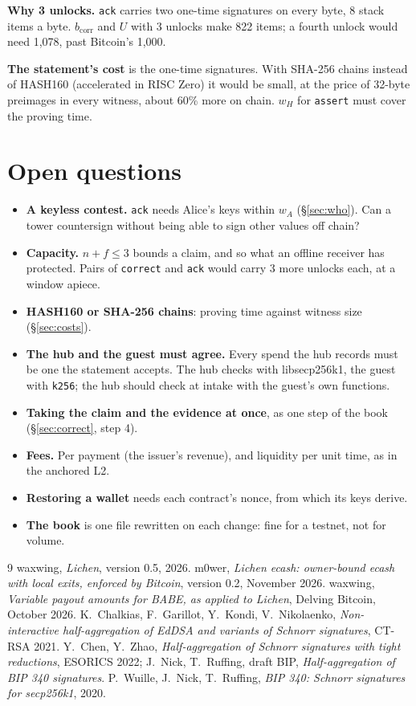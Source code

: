 \documentclass[11pt]{article}
\theoremstyle{plain}
\theoremstyle{definition}
\newcommand{\bcorr}{b_{\mathrm{corr}}}
\newcommand{\tx}[1]{\texttt{#1}}
\begin{document}
\textbf{Why 3 unlocks.} \tx{ack} carries two one-time signatures on
every byte, 8 stack items a byte. $\bcorr$ and $U$ with 3 unlocks make
822 items; a fourth unlock would need 1,078, past Bitcoin's 1,000.

\textbf{The statement's cost} is the one-time signatures. With SHA-256
chains instead of HASH160 (accelerated in RISC Zero) it would be small,
at the price of 32-byte preimages in every witness, about 60\% more
on chain. $w_H$ for \tx{assert} must cover the proving time.

\section{Open questions}\label{sec:open}

\begin{itemize}[nosep]
\item \textbf{A keyless contest.} \tx{ack} needs Alice's keys within
  $w_A$ (\S\ref{sec:who}). Can a tower countersign without being able
  to sign other values off chain?
\item \textbf{Capacity.} $n + f \le 3$ bounds a claim, and so what an
  offline receiver has protected. Pairs of \tx{correct} and \tx{ack}
  would carry 3 more unlocks each, at a window apiece.
\item \textbf{HASH160 or SHA-256 chains}: proving time against witness
  size (\S\ref{sec:costs}).
\item \textbf{The hub and the guest must agree.} Every spend the hub
  records must be one the statement accepts. The hub checks with
  libsecp256k1, the guest with \tx{k256}; the hub should check at intake
  with the guest's own functions.
\item \textbf{Taking the claim and the evidence at once}, as one step
  of the book (\S\ref{sec:correct}, step 4).
\item \textbf{Fees.} Per payment (the issuer's revenue), and liquidity
  per unit time, as in the anchored L2.
\item \textbf{Restoring a wallet} needs each contract's nonce, from
  which its keys derive.
\item \textbf{The book} is one file rewritten on each change: fine for a
  testnet, not for volume.
\end{itemize}

\begin{thebibliography}{9}
 waxwing, \emph{Lichen}, version 0.5, 2026.
 m0wer, \emph{Lichen ecash: owner-bound ecash with local
  exits, enforced by Bitcoin}, version 0.2, November 2026.
 waxwing, \emph{Variable payout amounts for BABE, as
  applied to Lichen}, Delving Bitcoin, October 2026.
 K.~Chalkias, F.~Garillot, Y.~Kondi, V.~Nikolaenko,
  \emph{Non-interactive half-aggregation of EdDSA and variants of Schnorr
  signatures}, CT-RSA 2021.
 Y.~Chen, Y.~Zhao, \emph{Half-aggregation of Schnorr
  signatures with tight reductions}, ESORICS 2022; J.~Nick, T.~Ruffing,
  draft BIP, \emph{Half-aggregation of BIP 340 signatures}.
 P.~Wuille, J.~Nick, T.~Ruffing, \emph{BIP 340: Schnorr
  signatures for secp256k1}, 2020.
\end{thebibliography}
\end{document}
